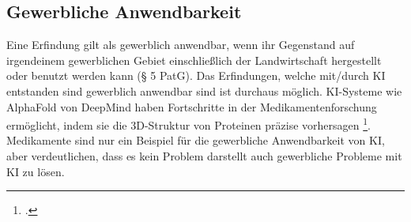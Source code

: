 \subsection{Gewerbliche Anwendbarkeit}
Eine Erfindung gilt als gewerblich anwendbar, 
wenn ihr Gegenstand auf irgendeinem gewerblichen
Gebiet einschließlich der Landwirtschaft hergestellt 
oder benutzt werden kann (§ 5 PatG).
Das Erfindungen, 
welche mit/durch KI entstanden sind gewerblich anwendbar sind ist durchaus möglich.
KI-Systeme wie AlphaFold von DeepMind haben Fortschritte 
in der Medikamentenforschung ermöglicht, 
indem sie die 3D-Struktur von Proteinen präzise vorhersagen \footcite{AlphaFold2024}.
Medikamente sind nur ein Beispiel für die gewerbliche Anwendbarkeit von KI,
aber verdeutlichen, dass es kein Problem darstellt auch gewerbliche Probleme 
mit KI zu lösen.
\\





